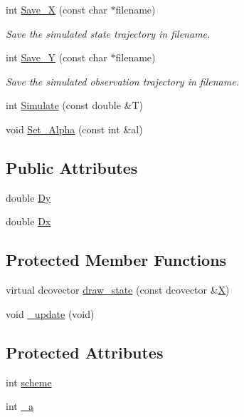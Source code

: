 \begin{CompactItemize}
int \hyperlink{class_c_d___simulator_7d9d7bb805654ee7ee1f2235364bc19e}{Save\_\-X} (const char $\ast$filename)
\begin{CompactList}\small\item\em Save the simulated state trajectory in filename. \item\end{CompactList}\item 
int \hyperlink{class_c_d___simulator_f9d3fb4fbc4b77afd81fb8b67e003cee}{Save\_\-Y} (const char $\ast$filename)
\begin{CompactList}\small\item\em Save the simulated observation trajectory in filename. \item\end{CompactList}\item 
int \hyperlink{class_c_d___simulator_fde7cba27399a95337431770b42b3772}{Simulate} (const double \&T)
\item 
void \hyperlink{class_c_d___simulator_6f78aafc96ae191c7b9815055ce4e956}{Set\_\-Alpha} (const int \&al)
\end{CompactItemize}
\subsection*{Public Attributes}
\begin{CompactItemize}
\item 
double \hyperlink{class_c_d___simulator_8c84fdf15866c0ea1cb79977f77639d2}{Dy}
\item 
double \hyperlink{class_c_d___simulator_adb3b1b1b8bd6deabea8a62fcec33138}{Dx}
\end{CompactItemize}
\subsection*{Protected Member Functions}
\begin{CompactItemize}
\item 
virtual dcovector \hyperlink{class_c_d___simulator_11c411df9b1e0d6f8576edefd723dd47}{draw\_\-state} (const dcovector \&\hyperlink{class_simulator_a2db8ace19099d996be516022d230bc0}{X})
\item 
void \hyperlink{class_c_d___simulator_efc4b4521a9d4cd6658c16feb9233e14}{\_\-update} (void)
\end{CompactItemize}
\subsection*{Protected Attributes}
\begin{CompactItemize}
\item 
int \hyperlink{class_c_d___simulator_a19045bbd5c743d900780338ab355035}{scheme}
\item 
int \hyperlink{class_c_d___simulator_f9d59b82e56e035230af9cf7d7767a9c}{\_\-a}
\end{CompactItemize}


